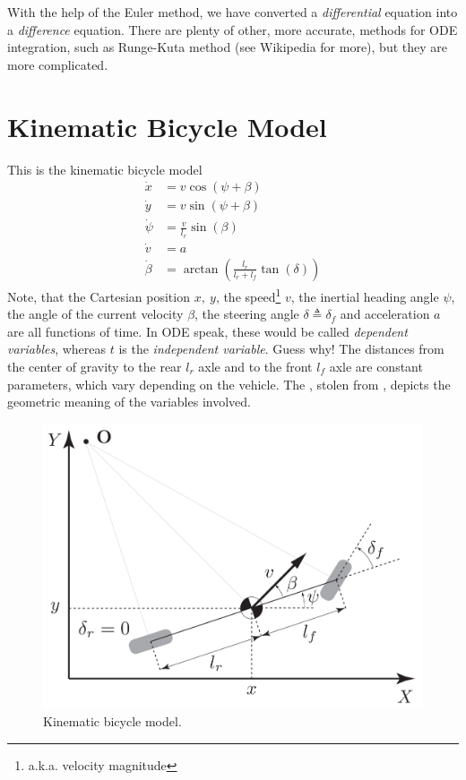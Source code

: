 \documentclass[a4paper]{article}
\begin{document}
With the help of the Euler method, we have converted a \emph{differential} equation into a \emph{difference} equation.
There are plenty of other, more accurate, methods for ODE integration, such as Runge-Kuta method (see Wikipedia for more), but they are more complicated.



\section{Kinematic Bicycle Model}\label{sec:kinematic_bicycle_model}
This is the kinematic bicycle model
\begin{subequations}
\begin{align}\label{eq:kinematic_bicycle_model_continuous}
\dot{x} 	&=  v \cos(\psi + \beta) \\
\dot{y} 	&=  v \sin(\psi + \beta) \\
\dot{\psi} 	&=  \frac{v}{l_r} \sin(\beta) \\
\dot{v} 	&=  a \\
\dot{\beta} &= \arctan\left(\frac{l_r}{l_r + l_f}\tan(\delta)\right)
\end{align}
\end{subequations}
Note, that the Cartesian position \( x,\ y \), the speed\footnote{a.k.a. velocity magnitude} \( v \), the inertial heading angle \( \psi \), the angle of the current velocity \( \beta \), the steering angle \( \delta \triangleq \delta_f \) and acceleration \( a \) are all functions of time.
In ODE speak, these would be called \emph{dependent variables}, whereas \( t \) is the \emph{independent variable}.
Guess why!
The distances from the center of gravity to the rear \( l_r \) axle and to the front \( l_f \) axle are constant parameters, which vary depending on the vehicle.
The , stolen from \cite{Kong2015}, depicts the geometric meaning of the variables involved.
\begin{figure}[h]
	\centering
	\includegraphics[scale=0.2]{./img/kinematic_bicycle_model.png}
	\caption{Kinematic bicycle model.}
	\label{fig:kinematic_bicycle_model}
\end{figure}
\end{document}
